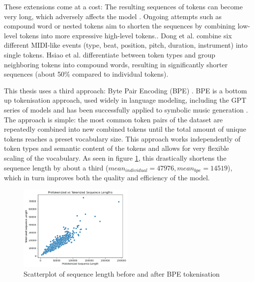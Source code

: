 These extensions come at a cost: The resulting sequences of tokens can become very long, which adversely affects the model \cite{Ji_Yang_Luo_survey_symbolic_2024}. Ongoing attempts such as compound word or nested tokens aim to shorten the sequences by combining low-level tokens into more expressive high-level tokens.\cite{Ryu_Dong_nested_2024}. Dong et al. \cite{Dong_Chen_MMT_Kirkpatrick_2023} combine six different MIDI-like events (type, beat, position, pitch, duration, instrument) into single tokens. Hsiao et al. \cite{compound_word_Hsiao_Liu_Yeh_Yang_2021} differentiate between token types and group neighboring tokens into compound words, resulting in significantly shorter sequences (about 50\% compared to individual tokens). 

This thesis uses a third approach: Byte Pair Encoding (BPE) \cite{Sennrich_Haddow_Birch_BPE_2016}. BPE is a bottom up tokenisation approach, used widely in language modeling, including the GPT series of models \cite{Radford_Wu_Child_Luan_gpt2_2019}\cite{jurafskybook} and has been successfully applied to symbolic music generation \cite{Fradet_Gutowski_Chhel_Briot_2023}. The approach is simple: the most common token pairs of the dataset are repeatedly combined into new combined tokens until the total amount of unique tokens reaches a preset vocabulary size. This approach works independently of token types and semantic content of the tokens and allows for very flexible scaling of the vocabulary. As seen in figure \ref{fig:tok_compare}, this drastically shortens the sequence length by about a third ($mean_{individual}=47976, mean_{bpe}=14519$), which in turn improves both the quality and efficiency of the model. 


\begin{figure}[H]
    \centering
    \includegraphics[width=0.5\textwidth]{IMAGES/scatter_pre_post_tok.png} 
    \caption{Scatterplot of sequence length before and after BPE tokenisation}
    \label{fig:tok_compare}
\end{figure}
